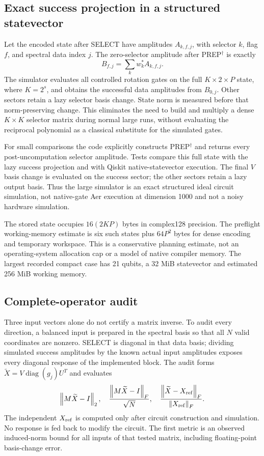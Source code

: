 \documentclass[journal]{IEEEtran}
\newcommand{\norm}[1]{\left\lVert#1\right\rVert}
\begin{document}
\subsection{Exact success projection in a structured statevector}
Let the encoded state after SELECT have amplitudes $A_{k,f,j}$, with selector
$k$, flag $f$, and spectral data index $j$. The zero-selector amplitude after
PREP$^\dagger$ is exactly
\begin{equation}
 B_{f,j}=\sum_k w_k^*A_{k,f,j}.
 \label{eq:projection}
\end{equation}
The simulator evaluates all controlled rotation gates on the full
$K\times2\times P$ state, where $K=2^s$, and obtains the successful data
amplitudes from $B_{0,j}$. Other sectors retain a lazy selector basis change.
State norm is measured before that norm-preserving change. This eliminates
the need to build and multiply a dense $K\times K$ selector matrix during
normal large runs, without evaluating the reciprocal polynomial as a
classical substitute for the simulated gates.

For small comparisons the code explicitly constructs PREP$^\dagger$ and
returns every post-uncomputation selector amplitude. Tests compare this full
state with the lazy success projection and with Qiskit native-statevector
execution. The final $V$ basis change is evaluated on the success sector;
the other sectors retain a lazy output basis. Thus the large simulator is
an exact structured ideal circuit simulation, not native-gate Aer execution
at dimension 1000 and not a noisy hardware simulation.

The stored state occupies $16(2KP)$ bytes in complex128 precision. The
preflight working-memory estimate is six such states plus $64P^2$ bytes for
dense encoding and temporary workspace. This is a conservative planning
estimate, not an operating-system allocation cap or a model of native
compiler memory. The largest recorded compact case has 21 qubits, a 32 MiB
statevector and estimated 256 MiB working memory.

\subsection{Complete-operator audit}
Three input vectors alone do not certify a matrix inverse. To audit every
direction, a balanced input is prepared in the spectral basis so that all
$N$ valid coordinates are nonzero. SELECT is diagonal in that data basis;
dividing simulated success amplitudes by the known actual input amplitudes
exposes every diagonal response of the implemented block. The audit forms
$\widetilde X=V\operatorname{diag}(g_j)U^T$ and evaluates
\begin{equation}
 \norm{M\widetilde X-I}_2,\quad
 \frac{\norm{M\widetilde X-I}_F}{\sqrt N},\quad
 \frac{\norm{\widetilde X-X_{\rm ref}}_F}{\norm{X_{\rm ref}}_F}.
 \label{eq:audit}
\end{equation}
The independent $X_{\rm ref}$ is computed only after circuit construction
and simulation. No response is fed back to modify the circuit. The first
metric is an observed induced-norm bound for all inputs of that tested
matrix, including floating-point basis-change error.
\end{document}
